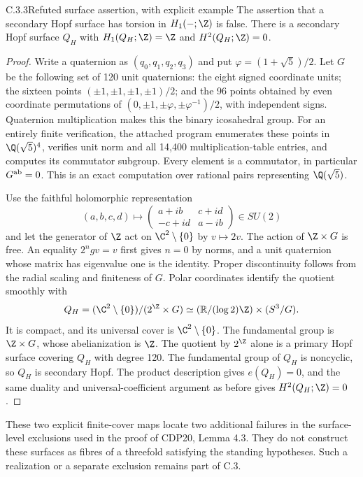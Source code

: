 \begin{idstatement}{C.3.3}{Refuted surface assertion, with explicit example}
\label{st:C.3.3}
The assertion that a secondary Hopf surface has torsion in
$H_1(-;\Z)$ is false. There is a secondary Hopf surface $Q_H$ with
$H_1(Q_H;\Z)=\Z$ and $H^2(Q_H;\Z)=0$.
\end{idstatement}
\begin{proof}
Write a quaternion as $(q_0,q_1,q_2,q_3)$ and put
$\varphi=(1+\sqrt5)/2$. Let $G$ be the following set of 120 unit
quaternions: the eight signed coordinate units; the sixteen points
$(\pm1,\pm1,\pm1,\pm1)/2$; and the 96 points obtained by even
coordinate permutations of
$(0,\pm1,\pm\varphi,\pm\varphi^{-1})/2$, with independent signs.
Quaternion multiplication makes this the binary icosahedral group.
For an entirely finite verification, the attached program enumerates
these points in $\Q(\sqrt5)^4$, verifies unit norm and all 14,400
multiplication-table entries, and computes its commutator subgroup.
Every element is a commutator, in particular $G^{\rm ab}=0$.
This is an exact computation over rational pairs representing
$\Q(\sqrt5)$.

Use the faithful holomorphic representation
\[
(a,b,c,d)\longmapsto
\begin{pmatrix}a+ib&c+id\\-c+id&a-ib\end{pmatrix}\in SU(2)
\]
and let the generator of $\Z$ act on $\C^2\setminus\{0\}$ by
$v\mapsto2v$. The action of $\Z\times G$ is free. An equality
$2^ngv=v$ first gives $n=0$ by norms, and a unit quaternion whose
matrix has eigenvalue one is the identity. Proper discontinuity
follows from the radial scaling and finiteness of $G$.
Polar coordinates identify the quotient smoothly with
\[
Q_H=(\C^2\setminus\{0\})/(2^{\Z}\times G)
\simeq (\mathbb R/(\log2)\Z)\times(S^3/G).
\]
It is compact, and its universal cover is $\C^2\setminus\{0\}$.
The fundamental group is $\Z\times G$, whose abelianization is
$\Z$. The quotient by $2^{\Z}$ alone is a primary Hopf surface
covering $Q_H$ with degree 120. The fundamental group of $Q_H$ is
noncyclic, so $Q_H$ is secondary Hopf. The product description gives
$e(Q_H)=0$, and the same duality and universal-coefficient argument
as before gives $H^2(Q_H;\Z)=0$.
\end{proof}

These two explicit finite-cover maps locate two additional failures
in the surface-level exclusions used in the proof of CDP20,
Lemma 4.3. They do not construct these surfaces as fibres of a
threefold satisfying the standing hypotheses. Such a realization or
a separate exclusion remains part of C.3.



